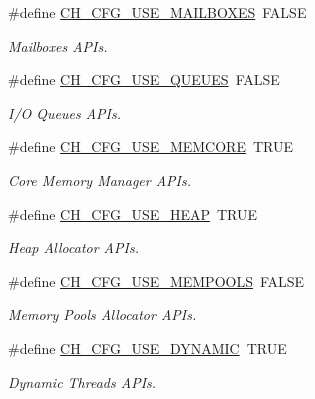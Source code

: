 \begin{DoxyCompactItemize}
\#define \hyperlink{group__config_gae7b225553e9e069eda0dc0a251e0882c}{C\+H\+\_\+\+C\+F\+G\+\_\+\+U\+S\+E\+\_\+\+M\+A\+I\+L\+B\+O\+X\+ES}~F\+A\+L\+SE
\begin{DoxyCompactList}\small\item\em Mailboxes A\+P\+Is. \end{DoxyCompactList}\item 
\#define \hyperlink{group__config_ga9bb08f7384ee7ec4893bb28723286ee3}{C\+H\+\_\+\+C\+F\+G\+\_\+\+U\+S\+E\+\_\+\+Q\+U\+E\+U\+ES}~F\+A\+L\+SE
\begin{DoxyCompactList}\small\item\em I/O Queues A\+P\+Is. \end{DoxyCompactList}\item 
\#define \hyperlink{group__config_gaad95228d05e4107b33836d30d21645a7}{C\+H\+\_\+\+C\+F\+G\+\_\+\+U\+S\+E\+\_\+\+M\+E\+M\+C\+O\+RE}~T\+R\+UE
\begin{DoxyCompactList}\small\item\em Core Memory Manager A\+P\+Is. \end{DoxyCompactList}\item 
\#define \hyperlink{group__config_ga0968280d9bbbcda48177d14d77058737}{C\+H\+\_\+\+C\+F\+G\+\_\+\+U\+S\+E\+\_\+\+H\+E\+AP}~T\+R\+UE
\begin{DoxyCompactList}\small\item\em Heap Allocator A\+P\+Is. \end{DoxyCompactList}\item 
\#define \hyperlink{group__config_ga826c1fac997fb6e976c3012d20316444}{C\+H\+\_\+\+C\+F\+G\+\_\+\+U\+S\+E\+\_\+\+M\+E\+M\+P\+O\+O\+LS}~F\+A\+L\+SE
\begin{DoxyCompactList}\small\item\em Memory Pools Allocator A\+P\+Is. \end{DoxyCompactList}\item 
\#define \hyperlink{group__config_ga6ae82f40768d872dea807aac79e38deb}{C\+H\+\_\+\+C\+F\+G\+\_\+\+U\+S\+E\+\_\+\+D\+Y\+N\+A\+M\+IC}~T\+R\+UE
\begin{DoxyCompactList}\small\item\em Dynamic Threads A\+P\+Is. \end{DoxyCompactList}\end{DoxyCompactItemize}
